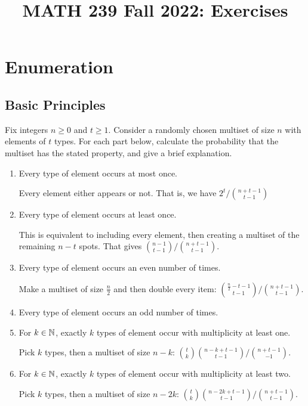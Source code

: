 \documentclass[class=math239,notes]{agony}
\title{MATH 239 Fall 2022: Exercises}
\begin{document}
\tableofcontents
\pagebreak

\chapter{Enumeration}

\section{Basic Principles}

\begin{xca}
  Fix integers $n \geq 0$ and $t \geq 1$.
  Consider a randomly chosen multiset of size $n$ with elements of $t$ types.
  For each part below, calculate the probability that the multiset has the stated property,
  and give a brief explanation.
\end{xca}
\begin{enumerate}
  \item Every type of element occurs at most once.
        \begin{sol}
          Every element either appears or not.
          That is, we have $2^t/\binom{n+t-1}{t-1}$
        \end{sol}
  \item Every type of element occurs at least once.
        \begin{sol}
          This is equivalent to including every element,
          then creating a multiset of the remaining $n-t$ spots.
          That gives $\binom{n-1}{t-1}/\binom{n+t-1}{t-1}$.
        \end{sol}
  \item Every type of element occurs an even number of times.
        \begin{sol}
          Make a multiset of size $\frac{n}{2}$ and then double every item:
          $\binom{\frac{n}{2}-t-1}{t-1}/\binom{n+t-1}{t-1}$.
        \end{sol}
  \item Every type of element occurs an odd number of times.
  \item For $k \in \mathbb{N}$, exactly $k$ types of element occur
        with multiplicity at least one.
        \begin{sol}
          Pick $k$ types, then a multiset of size $n-k$:
          $\binom{t}{k}\binom{n-k+t-1}{t-1}/\binom{n+t-1}{-1}$.
        \end{sol}
  \item For $k \in \mathbb{N}$, exactly $k$ types of element occur
        with multiplicity at least two.
        \begin{sol}
          Pick $k$ types, then a multiset of size $n-2k$:
          $\binom{t}{k}\binom{n-2k+t-1}{t-1}/\binom{n+t-1}{t-1}$.
        \end{sol}
\end{enumerate}
\end{document}
